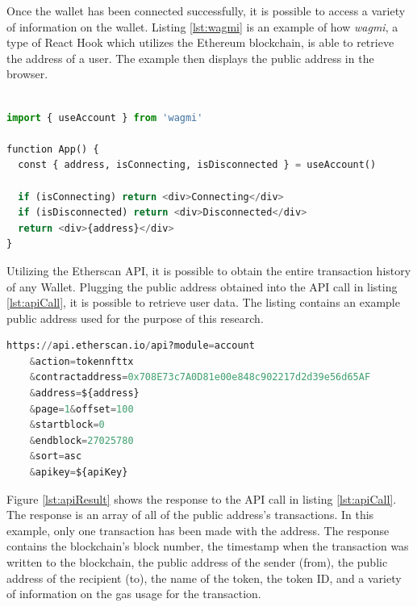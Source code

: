 Once the wallet has been connected successfully, it is possible to access a variety of information on the wallet. Listing \ref{lst:wagmi} is an example of how \textit{wagmi}, a type of React Hook which utilizes the Ethereum blockchain, is able to retrieve the address of a user. The example then displays the public address in the browser.


\begin{center}
\begin{lstlisting}[label=lst:wagmi ,language=python, caption=An example of getting a wallet's public address using \textit{wagmi React Hooks for Ethereum} \cite{wagmi}. This can be used once the wallet has been connected successfully., captionpos=b]

import { useAccount } from 'wagmi'
 
function App() {
  const { address, isConnecting, isDisconnected } = useAccount()
 
  if (isConnecting) return <div>Connecting</div>
  if (isDisconnected) return <div>Disconnected</div>
  return <div>{address}</div>
}

\end{lstlisting}
\end{center}

Utilizing the Etherscan API, it is possible to obtain the entire transaction history of any Wallet. Plugging the public address obtained into the API call in listing \ref{lst:apiCall}, it is possible to retrieve user data. The listing contains an example public address used for the purpose of this research.

\begin{center}
\begin{lstlisting}[label=lst:apiCall ,language=python, caption=A real-world example API call made from the frontend in order to retrieve all of a user's transactional data. The API is provided by \textit{Etherscan} \cite{etherscan}., captionpos=b]
https://api.etherscan.io/api?module=account
    &action=tokennfttx
    &contractaddress=0x708E73c7A0D81e00e848c902217d2d39e56d65AF
    &address=${address}
    &page=1&offset=100
    &startblock=0
    &endblock=27025780
    &sort=asc
	&apikey=${apiKey}
\end{lstlisting}
\end{center}

Figure \ref{lst:apiResult} shows the response to the API call in listing \ref{lst:apiCall}. The response is an array of all of the public address's transactions. In this example, only one transaction has been made with the address. The response contains the blockchain's block number, the timestamp when the transaction was written to the blockchain, the public address of the sender (from), the public address of the recipient (to), the name of the token, the token ID, and a variety of information on the gas usage for the transaction.


